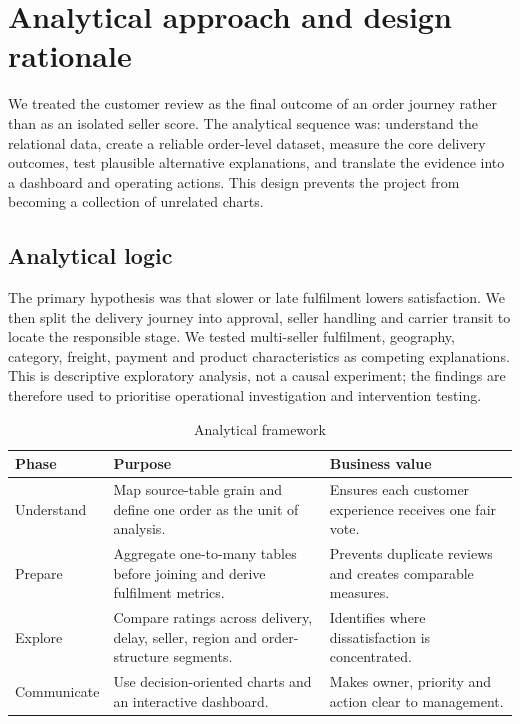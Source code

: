 \documentclass[11pt,a4paper]{article}
\begin{document}
\section{Analytical approach and design rationale}

We treated the customer review as the final outcome of an order journey rather than as an isolated seller score. The analytical sequence was: understand the relational data, create a reliable order-level dataset, measure the core delivery outcomes, test plausible alternative explanations, and translate the evidence into a dashboard and operating actions. This design prevents the project from becoming a collection of unrelated charts.

\subsection{Analytical logic}
The primary hypothesis was that slower or late fulfilment lowers satisfaction. We then split the delivery journey into approval, seller handling and carrier transit to locate the responsible stage. We tested multi-seller fulfilment, geography, category, freight, payment and product characteristics as competing explanations. This is descriptive exploratory analysis, not a causal experiment; the findings are therefore used to prioritise operational investigation and intervention testing.

\begin{table}[h]
\centering
\caption{Analytical framework}
\begin{tabularx}{\textwidth}{L{2.6cm} L{5.6cm} L{5.6cm}}
\toprule
\textbf{Phase} & \textbf{Purpose} & \textbf{Business value} \\
\midrule
Understand & Map source-table grain and define one order as the unit of analysis. & Ensures each customer experience receives one fair vote. \\
Prepare & Aggregate one-to-many tables before joining and derive fulfilment metrics. & Prevents duplicate reviews and creates comparable measures. \\
Explore & Compare ratings across delivery, delay, seller, region and order-structure segments. & Identifies where dissatisfaction is concentrated. \\
Communicate & Use decision-oriented charts and an interactive dashboard. & Makes owner, priority and action clear to management. \\
\bottomrule
\end{tabularx}
\end{table}
\end{document}
